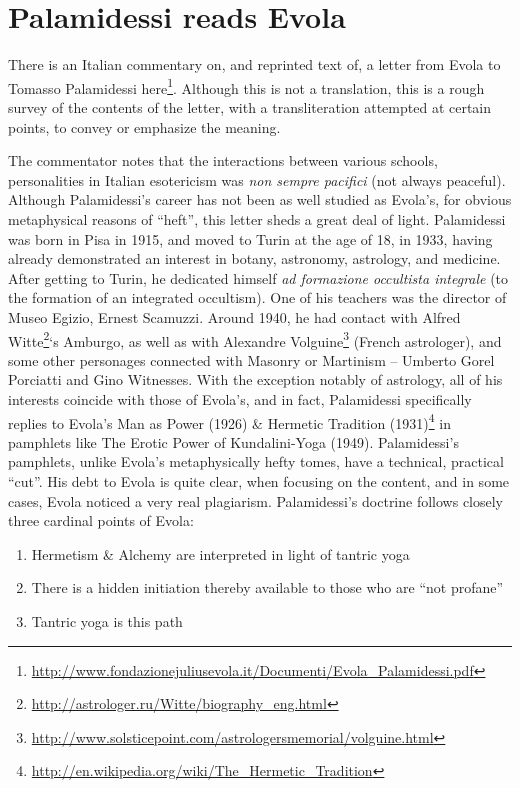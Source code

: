 \section{Palamidessi reads Evola}

There is an Italian commentary on, and reprinted text of, a letter from Evola to Tomasso Palamidessi here\footnote{\url{http://www.fondazionejuliusevola.it/Documenti/Evola_Palamidessi.pdf}}. Although this is not a translation, this is a rough survey of the contents of the letter, with a transliteration attempted at certain points, to convey or emphasize the meaning.

The commentator notes that the interactions between various schools, personalities in Italian esotericism was \emph{non sempre pacifici} (not always peaceful). Although Palamidessi's career has not been as well studied as Evola's, for obvious metaphysical reasons of ``heft'', this letter sheds a great deal of light. Palamidessi was born in Pisa in 1915, and moved to Turin at the age of 18, in 1933, having already demonstrated an interest in botany, astronomy, astrology, and medicine. After getting to Turin, he dedicated himself \emph{ad formazione occultista integrale} (to the formation of an integrated occultism). One of his teachers was the director of Museo Egizio, Ernest Scamuzzi. Around 1940, he had contact with Alfred Witte\footnote{\url{http://astrologer.ru/Witte/biography_eng.html}}`s Amburgo, as well as with Alexandre Volguine\footnote{\url{http://www.solsticepoint.com/astrologersmemorial/volguine.html}} (French astrologer), and some other personages connected with Masonry or Martinism -- Umberto Gorel Porciatti and Gino Witnesses. With the exception notably of astrology, all of his interests coincide with those of Evola's, and in fact, Palamidessi specifically replies to Evola's Man as Power (1926) \& Hermetic Tradition (1931)\footnote{\url{http://en.wikipedia.org/wiki/The_Hermetic_Tradition}} in pamphlets like The Erotic Power of Kundalini-Yoga (1949). Palamidessi's pamphlets, unlike Evola's metaphysically hefty tomes, have a technical, practical ``cut''. His debt to Evola is quite clear, when focusing on the content, and in some cases, Evola noticed a very real plagiarism. Palamidessi's doctrine follows closely three cardinal points of Evola:
\begin{enumerate}
\item Hermetism \& Alchemy are interpreted in light of tantric yoga

\item There is a hidden initiation thereby available to those who are ``not profane''

\item Tantric yoga is this path
\end{enumerate}

